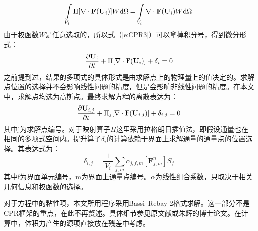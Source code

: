 \begin{equation}
  \int\limits_{V_i}\Pi [\nabla \cdot \mathbf{F}(\mathbf{U}_i)]W{\rm d}\Omega
  = \int\limits_{V_i}\nabla \cdot \mathbf{F}(\mathbf{U}_i)W{\rm d}\Omega
\end{equation}
由于权函数$W$是任意选取的，所以式（\ref{e:CPR3}）可以拿掉积分号，得到微分形式：
\begin{equation}
  \frac{\partial \mathbf{U}_i}{\partial t} + \Pi[\nabla \cdot \mathbf{F}(\mathbf{U}_i)]  + \delta_i = 0
\end{equation}
之前提到过，结果的多项式的具体形式是由求解点上的物理量上的值决定的。求解点位置的选择并不会影响线性问题的精度，但是会影响非线性问题的精度。在本文中，求解点均选为高斯点。最终求解方程的离散表达为：
\begin{equation}
  \frac{\partial \mathbf{U}_{i,j}}{\partial t} + \Pi_j[\nabla \cdot \mathbf{F}(\mathbf{U}_{i,j})]  + \delta_{i,j} = 0
\end{equation}
其中j为求解点编号。对于映射算子$\Pi$这里采用拉格朗日插值法，即假设通量也在相同的多项式空间内。提升算子$\delta_i$的计算依赖于界面上求解通量的通量点的位置选择。其表达式为：
\begin{equation}
  \delta_{i,j}=\frac{1}{\left| V_i\right|}\sum\limits_{f,m}\alpha_{j,f,m}[\mathbf{F}^n_{f,m}]S_f
\end{equation}
其中f为界面单元编号，m为界面上通量点编号。$\alpha$为线性组合系数，只取决于相关几何信息和权函数的选择。

对于方程中的粘性项，本文所用程序采用Bassi–Rebay 2格式求解\cite{Bassi1997}。这一部分不是CPR框架的重点，在此不再赘述。具体细节参见原文献或朱辉的博士论文\cite{zhuhui}。在计算中，体积力产生的源项直接放在残差中考虑。